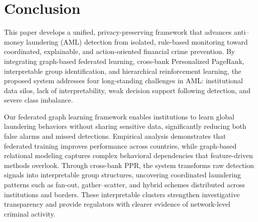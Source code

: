 \documentclass[11pt,english]{article}
\begin{document}






\section{Conclusion}
This paper develops a unified, privacy-preserving framework that advances anti–money laundering (AML) detection from isolated, rule-based monitoring toward coordinated, explainable, and action-oriented financial crime prevention. By integrating graph-based federated learning, cross-bank Personalized PageRank, interpretable group identification, and hierarchical reinforcement learning, the proposed system addresses four long-standing challenges in AML: institutional data silos, lack of interpretability, weak decision support following detection, and severe class imbalance.

Our federated graph learning framework enables institutions to learn global laundering behaviors without sharing sensitive data, significantly reducing both false alarms and missed detections. Empirical analysis demonstrates that federated training improves performance across countries, while graph-based relational modeling captures complex behavioral dependencies that feature-driven methods overlook. Through cross-bank PPR, the system transforms raw detection signals into interpretable group structures, uncovering coordinated laundering patterns such as fan-out, gather–scatter, and hybrid schemes distributed across institutions and borders. These interpretable clusters strengthen investigative transparency and provide regulators with clearer evidence of network-level criminal activity.
\end{document}
